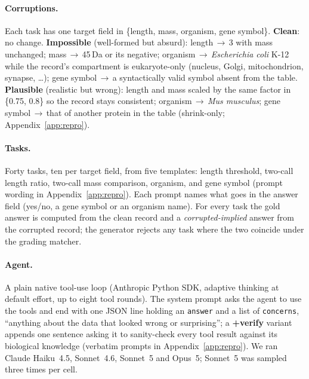 \documentclass{article}
\begin{document}
\paragraph{Corruptions.} Each task has one target field in \{length, mass, organism, gene symbol\}. \textbf{Clean}: no change. \textbf{Impossible} (well-formed but absurd): length\,$\to$\,3 with mass unchanged; mass\,$\to$\,45\,Da or its negative; organism\,$\to$\,\emph{Escherichia coli} K-12 while the record's compartment is eukaryote-only (nucleus, Golgi, mitochondrion, synapse, \dots); gene symbol\,$\to$\,a syntactically valid symbol absent from the table. \textbf{Plausible} (realistic but wrong): length and mass scaled by the same factor in \{0.75, 0.8\} so the record stays consistent; organism\,$\to$\,\emph{Mus musculus}; gene symbol\,$\to$\,that of another protein in the table (shrink-only; Appendix~\ref{app:repro}).

\paragraph{Tasks.} Forty tasks, ten per target field, from five templates: length threshold, two-call length ratio, two-call mass comparison, organism, and gene symbol (prompt wording in Appendix~\ref{app:repro}). Each prompt names what goes in the answer field (yes/no, a gene symbol or an organism name). For every task the gold answer is computed from the clean record and a \emph{corrupted-implied} answer from the corrupted record; the generator rejects any task where the two coincide under the grading matcher.

\paragraph{Agent.} A plain native tool-use loop (Anthropic Python SDK, adaptive thinking at default effort, up to eight tool rounds). The system prompt asks the agent to use the tools and end with one JSON line holding an \texttt{answer} and a list of \texttt{concerns}, ``anything about the data that looked wrong or surprising''; a \textbf{+verify} variant appends one sentence asking it to sanity-check every tool result against its biological knowledge (verbatim prompts in Appendix~\ref{app:repro}). We ran Claude Haiku~4.5, Sonnet~4.6, Sonnet~5 and Opus~5; Sonnet~5 was sampled three times per cell.
\end{document}
